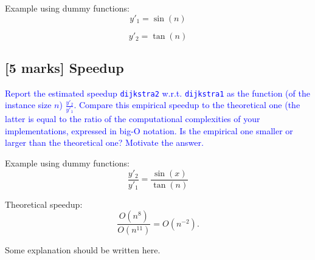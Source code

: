 \documentclass[a4paper]{article}
\numberwithin{equation}{section} %
\begin{document}
Example using dummy functions:
%
\begin{equation}\label{eq:1}
  y'_1 = \sin(n)
\end{equation}

\begin{equation}\label{eq:2}
  y'_2 = \tan(n)
\end{equation}


\subsection{[5 marks] Speedup}

\textcolor{blue}{
  Report the estimated speedup {\tt dijkstra2} w.r.t. {\tt dijkstra1} as the function (of the instance size $n$) $\frac{y'_2}{y'_1}$.
  Compare this empirical speedup to the theoretical one (the latter is equal to the ratio of the computational complexities of your implementations, expressed in big-O notation.
  Is the empirical one smaller or larger than the theoretical one? Motivate the answer.
}


Example using dummy functions:
%
\begin{equation}
  \frac{y'_2}{y'_1} = \frac{\sin(x)}{\tan(n)}
\end{equation}

Theoretical speedup:
\begin{equation}
  \frac{O(n^8)}{O(n^{11})} = O(n^{-2}).
\end{equation}



Some explanation should be written here.
\end{document}
